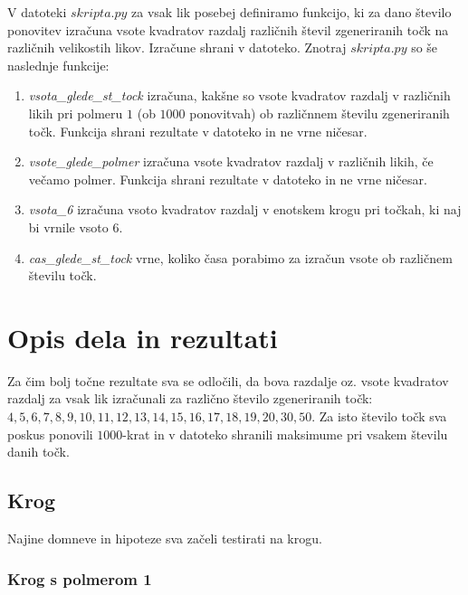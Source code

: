 \documentclass[a4paper]{article}
\begin{document}
V datoteki \colorbox{gray!10}{$skripta.py$} za vsak lik posebej definiramo funkcijo, ki za dano število ponovitev izračuna vsote kvadratov razdalj različnih števil zgeneriranih točk na različnih velikostih likov. Izračune shrani v datoteko.
Znotraj \colorbox{gray!10}{$skripta.py$} so še naslednje funkcije:
\begin{enumerate}
\item \textit{vsota\_glede\_st\_tock} izračuna, kakšne so vsote kvadratov razdalj v različnih likih pri polmeru $1$ (ob $1000$ ponovitvah) ob različnnem številu zgeneriranih točk. Funkcija shrani rezultate v datoteko in ne vrne ničesar.
\item \textit{vsote\_glede\_polmer} izračuna vsote kvadratov razdalj v različnih likih, če večamo polmer. Funkcija shrani rezultate v datoteko in ne vrne ničesar.
\item \textit{vsota\_6} izračuna vsoto kvadratov razdalj v enotskem krogu pri točkah, ki naj bi vrnile vsoto $6$.
\item \textit{cas\_glede\_st\_tock} vrne, koliko časa porabimo za izračun vsote ob različnem številu točk.
\end{enumerate}



\section{Opis dela in rezultati}

Za čim bolj točne rezultate sva se odločili, da bova razdalje oz. vsote kvadratov razdalj za vsak lik izračunali za različno število zgeneriranih točk: $4, 5, 6, 7, 8, 9, 10, 11, 12, 13, 14, 15, 16, 17, 18, 19, 20, 30, 50$. Za isto število točk sva poskus ponovili $1000$-krat in v datoteko shranili maksimume pri vsakem številu danih točk.

\subsection{Krog}

Najine domneve in hipoteze sva začeli testirati na krogu.

\subsubsection{Krog s polmerom 1}
\end{document}

